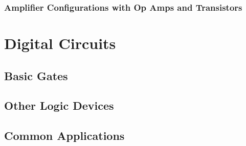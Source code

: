 \documentclass[12pt]{report}
\begin{document}




\subsection{Amplifier Configurations with Op Amps and Transistors}



\newpage
\chapter{Digital Circuits}
\section{Basic Gates}

\section{Other Logic Devices}

\section{Common Applications}
\end{document}
